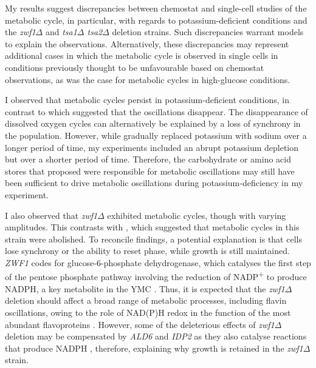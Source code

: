 My results suggest discrepancies between chemostat and single-cell studies of the metabolic cycle, in particular, with regards to potassium-deficient conditions and the \textit{zwf1$\Delta$} and \textit{tsa1$\Delta$ tsa2$\Delta$} deletion strains.
Such discrepancies warrant models to explain the observations.
Alternatively, these discrepancies may represent additional cases in which the metabolic cycle is observed in single cells in conditions previously thought to be unfavourable based on chemostat observations, as was the case for metabolic cycles in high-glucose conditions.

I observed that metabolic cycles persist in potassium-deficient conditions, in contrast to \textcite{oneillEukaryoticCellBiology2020} which suggested that the oscillations disappear.
The disappearance of dissolved oxygen cycles can alternatively be explained by a loss of synchrony in the population.
However, while \textcite{oneillEukaryoticCellBiology2020} gradually replaced potassium with sodium over a longer period of time, my experiments included an abrupt potassium depletion but over a shorter period of time.
Therefore, the carbohydrate or amino acid stores that \textcite{oneillEukaryoticCellBiology2020} proposed were responsible for metabolic oscillations may still have been sufficient to drive metabolic oscillations during potassium-deficiency in my experiment.

I also observed that \textit{zwf1$\Delta$} exhibited metabolic cycles, though with varying amplitudes.
This contrasts with \textcite{tuCyclicChangesMetabolic2007}, which suggested that metabolic cycles in this strain were abolished.
To reconcile findings, a potential explanation is that cells lose synchrony or the ability to reset phase, while growth is still maintained.
\textit{ZWF1} codes for glucose-6-phosphate dehydrogenase, which catalyses the first step of the pentose phosphate pathway involving the reduction of NADP\textsuperscript{+} to produce NADPH, a key metabolite in the YMC \parencite{nogaeIsolationCharacterizationZWF11990}.
Thus, it is expected that the \textit{zwf1$\Delta$} deletion should affect a broad range of metabolic processes, including flavin oscillations, owing to the role of NAD(P)H redox in the function of the most abundant flavoproteins \parencite{gudipatiFlavoproteomeYeastSaccharomyces2014}.
However, some of the deleterious effects of \textit{zwf1$\Delta$} deletion may be compensated by \textit{ALD6} and \textit{IDP2} as they also catalyse reactions that produce NADPH \parencite{minardSourcesNADPHYeast2005}, therefore, explaining why growth is retained in the \textit{zwf1$\Delta$} strain.

